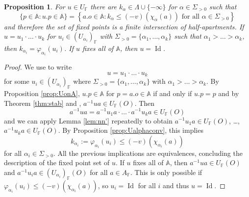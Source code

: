 \documentclass[12pt]{amsart}
\newcommand{\F}{\mathbb{F} }
\newcommand{\frakg}{\mathfrak{g}}
\newcommand{\A}{\mathbb{A}}
\numberwithin{equation}{section}
\newtheorem{proposition}[theorem]{Proposition}
\theoremstyle{remark} %
\begin{document}
\begin{proposition}\label{prop:Uconv}
	For $u\in U_\F$ there are $k_\alpha \in \Lambda \cup \{-\infty \}$ for $\alpha \in \Sigma_{>0}$ such that
	$$
	\{p \in \A \colon u.p \in \A\} = \left\{ a.o \in \A \colon  k_\alpha \leq (-v)\left(\chi_\alpha \left(a\right)\right) \text{ for all } \alpha \in \Sigma_{>0}   \right\}
	$$
	and therefore the set of fixed points is a finite intersection of half-apartments. If $u=u_1 \cdot \ldots \cdot u_k$ for $u_i \in (U_{\alpha_i})_\F$ with $\Sigma_{>0} = \{ \alpha_1, \ldots , \alpha_k \}$ such that $\alpha_1 > \ldots > \alpha_k$, then $k_{\alpha_i} = \varphi_{\alpha_i}(u_i)$. If $u$ fixes all of $\A$, then $u = \operatorname{Id}$. 
\end{proposition}
\begin{proof}
	We use \cite[Lemma \ref{I-lem:BCH_consequence}]{AppAGRCF} to write
	$$
	u = u_1 \cdot \ldots \cdot u_k
	$$
	for some $u_i \in (U_{\alpha_i})_\F$ where $\Sigma_{>0}= \{\alpha_1, \ldots ,\alpha_k\}$ with $\alpha_1 > \ldots > \alpha_k$. By Proposition \ref{prop:UonA}, $u.p \in \A$ for $p=a.o\in \A$ if and only if $u.p=p$ and by Theorem \ref{thm:stab} and \cite[Proposition \ref{I-prop:anainN} ]{AppAGRCF}, $a^{-1}ua \in U_\F(O)$. Then
	$$
	a^{-1}ua = a^{-1}u_1a \cdot \ldots \cdot a^{-1}u_ka \in U_\F(O)
	$$ 
	and we can apply Lemma \ref{lem:nn'} repeatedly to obtain $a^{-1}u_1a \in U_\F(O)$, \ldots, $a^{-1}u_ka \in U_\F(O)$. By Proposition \ref{prop:Ualphaconv}, this implies
	$$
	k_{\alpha_i}:=\varphi_{\alpha_i}(u_i) \leq (-v)(\chi_{\alpha_i}(a))
	$$
	for all $\alpha_i \in \Sigma_{>0}$. All the previous implications are equivalences, concluding the description of the fixed point set of $u$. If $u$ fixes all of $\A$, then $a^{-1}ua \in U_\F(O)$ and $a^{-1}u_ia \in (U_{\alpha_i})_\F(O)$ for all $a \in A_\F$. This is only possible if $\varphi_{\alpha_i}(u_i) \leq (-v)(\chi_{\alpha_i}(a))$, so $u_i = \operatorname{Id}$ for all $i$ and thus $u = \operatorname{Id}$.
\end{proof}
%	
\end{document}
